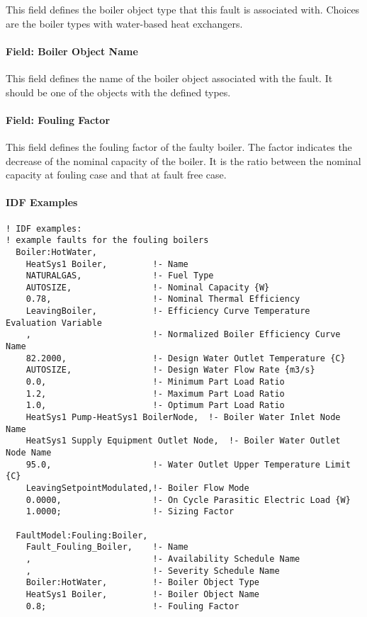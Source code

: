 This field defines the boiler object type that this fault is associated with. Choices are the boiler types with water-based heat exchangers.

\paragraph{Field: Boiler Object Name}\label{field-boiler-object-name}

This field defines the name of the boiler object associated with the fault. It should be one of the objects with the defined types.

\paragraph{Field: Fouling Factor}

This field defines the fouling factor of the faulty boiler. The factor indicates the decrease of the nominal capacity of the boiler. It is the ratio between the nominal capacity at fouling case and that at fault free case.

\paragraph{IDF Examples}

\begin{lstlisting}
! IDF examples:
! example faults for the fouling boilers
  Boiler:HotWater,
    HeatSys1 Boiler,         !- Name
    NATURALGAS,              !- Fuel Type
    AUTOSIZE,                !- Nominal Capacity {W}
    0.78,                    !- Nominal Thermal Efficiency
    LeavingBoiler,           !- Efficiency Curve Temperature Evaluation Variable
    ,                        !- Normalized Boiler Efficiency Curve Name
    82.2000,                 !- Design Water Outlet Temperature {C}
    AUTOSIZE,                !- Design Water Flow Rate {m3/s}
    0.0,                     !- Minimum Part Load Ratio
    1.2,                     !- Maximum Part Load Ratio
    1.0,                     !- Optimum Part Load Ratio
    HeatSys1 Pump-HeatSys1 BoilerNode,  !- Boiler Water Inlet Node Name
    HeatSys1 Supply Equipment Outlet Node,  !- Boiler Water Outlet Node Name
    95.0,                    !- Water Outlet Upper Temperature Limit {C}
    LeavingSetpointModulated,!- Boiler Flow Mode
    0.0000,                  !- On Cycle Parasitic Electric Load {W}
    1.0000;                  !- Sizing Factor

  FaultModel:Fouling:Boiler,
    Fault_Fouling_Boiler,    !- Name
    ,                        !- Availability Schedule Name
    ,                        !- Severity Schedule Name
    Boiler:HotWater,         !- Boiler Object Type
    HeatSys1 Boiler,         !- Boiler Object Name
    0.8;                     !- Fouling Factor

\end{lstlisting}


